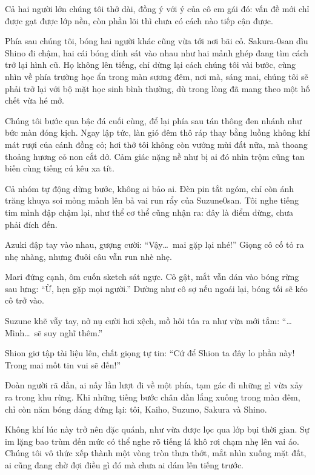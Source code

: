 \documentclass[../main.tex]{subfiles}
\begin{document}
Cả hai người lớn chúng tôi thở dài, đồng ý với ý của cô em gái đó: vấn đề mới chỉ được gạt được lớp nền, còn phần lõi thì chưa có cách nào tiếp cận được.

Phía sau chúng tôi, bóng hai người khác cũng vừa tới nơi bãi cỏ. Sakura-0san dìu Shino đi chậm, hai cái bóng dính sát vào nhau như hai mảnh ghép đang tìm cách trở lại hình cũ. Họ không lên tiếng, chỉ dừng lại cách chúng tôi vài bước, cùng nhìn về phía trường học ẩn trong màn sương đêm, nơi mà, sáng mai, chúng tôi sẽ phải trở lại với bộ mặt học sinh bình thường, dù trong lòng đã mang theo một hố chết vừa hé mở.

Chúng tôi bước qua bậc đá cuối cùng, để lại phía sau tán thông đen nhánh như bức màn đóng kịch. Ngay lập tức, làn gió đêm thô ráp thay bằng luồng không khí mát rượi của cánh đồng cỏ; hơi thở tôi không còn vướng mùi đất nữa, mà thoang thoảng hương cỏ non cắt dở. Cảm giác nặng nề như bị ai đó nhìn trộm cũng tan biến cùng tiếng cú kêu xa tít.

Cả nhóm tự động dừng bước, không ai bảo ai. Đèn pin tắt ngóm, chỉ còn ánh trăng khuya soi mỏng mảnh lên bả vai run rẩy của Suzune0san. Tôi nghe tiếng tim mình đập chậm lại, như thể cơ thể cũng nhận ra: đây là điểm dừng, chưa phải đích đến.

Azuki đập tay vào nhau, gượng cười: ``Vậy\dots\ mai gặp lại nhé!'' Giọng cô cố tỏ ra nhẹ nhàng, nhưng đuôi câu vẫn run nhè nhẹ.

Mari đứng cạnh, ôm cuốn sketch sát ngực. Cô gật, mắt vẫn dán vào bóng rừng sau lưng: ``Ừ, hẹn gặp mọi người.'' Dường như cô sợ nếu ngoái lại, bóng tối sẽ kéo cô trở vào.

Suzune khẽ vẫy tay, nở nụ cười hơi xệch, mồ hôi túa ra như vừa mới tắm: ``\dots Mình\dots\ sẽ suy nghĩ thêm.''

Shion giơ tập tài liệu lên, chất giọng tự tin: ``Cứ để Shion ta đây lo phần này! Trong mai mốt tin vui sẽ đến!''

Đoàn người rã dần, ai nấy lần lượt đi về một phía, tạm gác đi những gì vừa xảy ra trong khu rừng. Khi những tiếng bước chân dần lắng xuống trong màn đêm, chỉ còn năm bóng dáng đứng lại: tôi, Kaiho, Suzuno, Sakura và Shino.

Không khí lúc này trở nên đặc quánh, như vừa được lọc qua lớp bụi thời gian. Sự im lặng bao trùm đến mức có thể nghe rõ tiếng lá khô rơi chạm nhẹ lên vai áo. Chúng tôi vô thức xếp thành một vòng tròn thưa thớt, mắt nhìn xuống mặt đất, ai cũng đang chờ đợi điều gì đó mà chưa ai dám lên tiếng trước.
\end{document}
